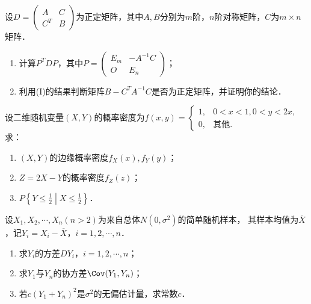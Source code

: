 \documentclass[plain,noanswer,medmath]{../../template/jnuexam}
\begin{document}
\begin{problem}[points=13]
设$D = \begin{pmatrix}
    A & C \\
  C^T & B
\end{pmatrix}$为正定矩阵，其中$A,B$分别为$m$阶，$n$阶对称矩阵，$C$为$m \times n$矩阵．
\begin{enumerate}
\item 计算$P^T DP$，其中$P = \begin{pmatrix}
  E_m & -A^{-1} C \\
    O & E_n
\end{pmatrix}$；
\item 利用(I)的结果判断矩阵$B - C^T A^{-1} C$是否为正定矩阵，并证明你的结论．
\end{enumerate}
\end{problem}


\begin{problem}[points=13]
设二维随机变量$(X,Y)$的概率密度为$f(x,y) = \begin{cases}
  1, & 0 < x < 1,0 < y < 2x, \\
  0, & \text{其他}.
\end{cases}$求：
\begin{enumerate}
\item $(X,Y)$的边缘概率密度$f_X(x),f_Y(y)$；
\item $Z = 2X - Y$的概率密度$f_Z(z)$；
\item $P\left\{Y \le \frac{1}{2} \middle| X \le \frac{1}{2} \right\}$．
\end{enumerate}
\end{problem}


\begin{problem}[points=13]
设$X_1,X_2, \cdots ,X_n(n > 2)$为来自总体$N(0,\sigma^2)$的简单随机样本，
其样本均值为$\overline{X}$，记$Y_i = X_i - \overline{X}$，$i = 1,2, \cdots ,n$．
\begin{enumerate}
\item 求$Y_i$的方差$DY_i$，$i = 1,2, \cdots ,n$；
\item 求$Y_1$与$Y_n$的协方差$\Cov (Y_1,Y_n)$；
\item 若$c(Y_1 + Y_n)^2$是$\sigma^2$的无偏估计量，求常数$c$．
\end{enumerate}
\end{problem}
\end{document}
